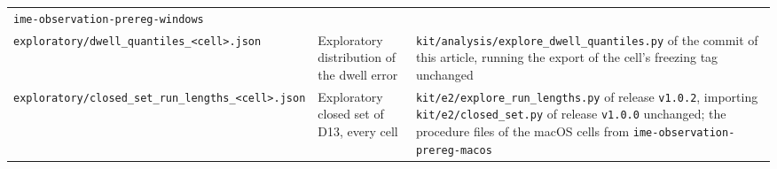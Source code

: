 {\begin{longtable}{L{0.30}L{0.20}L{0.50}}
\texttt{ime-observation-prereg-windows} \\
\texttt{exploratory/dwell\_quantiles\_<cell>.json} & Exploratory distribution of the dwell error & \texttt{kit/analysis/explore\_dwell\_quantiles.py}
of the commit of this article, running the export of the cell's freezing tag unchanged \\
\texttt{exploratory/\allowbreak closed\_set\_run\_lengths\_<cell>.json} & Exploratory closed set of D13, every cell &
\texttt{kit/e2/explore\_run\_lengths.py} of release \texttt{v1.0.2}, importing \texttt{kit/e2/closed\_set.py} of
release \texttt{v1.0.0} unchanged; the procedure files of the macOS cells from \texttt{ime-observation-prereg-macos} \\
\bottomrule
\end{longtable}
}
